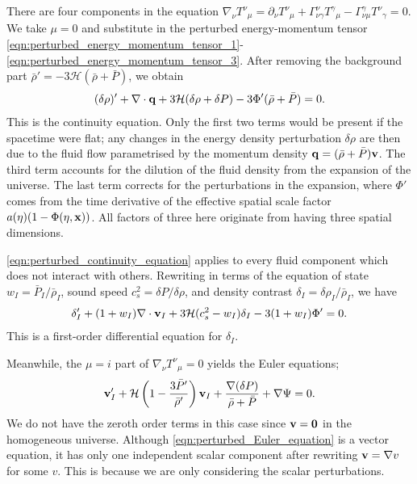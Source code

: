 There are four components in the equation $\nabla_\nu {T^\nu}_\mu = \partial_\nu {T^\nu}_\mu + \Gamma^\nu_{\nu\gamma} {T^\gamma}_\mu - \Gamma^\gamma_{\nu\mu} {T^\nu}_\gamma=0$. We take $\mu=0$ and substitute in the perturbed energy-momentum tensor \eqref{eqn:perturbed_energy_momentum_tensor_1}-\eqref{eqn:perturbed_energy_momentum_tensor_3}. After removing the background part $\bar{\rho}'=-3\mathcal{H}(\bar{\rho}+\bar{P})$, we obtain
\begin{align}
	(\delta\rho)' + \nabla \cdot \mathbf{q}+ 3 \mathcal{H} (\delta\rho + \delta P) - 3 \Phi' (\bar{\rho} + \bar{P})  = 0.  \label{eqn:perturbed_continuity_equation}
\end{align}
This is the continuity equation. Only the first two terms would be present if the spacetime were flat; any changes in the energy density perturbation $\delta\rho$ are then due to the fluid flow parametrised by the momentum density $\mathbf{q} = (\bar{\rho}+\bar{P})\mathbf{v}$. The third term accounts for the dilution of the fluid density from the expansion of the universe. The last term corrects for the perturbations in the expansion, where $\Phi'$ comes from the time derivative of the effective spatial scale factor $a(\eta)(1-\Phi(\eta,\mathbf{x}))$. All factors of three here originate from having three spatial dimensions.

\eqref{eqn:perturbed_continuity_equation} applies to every fluid component which does not interact with others. Rewriting in terms of the equation of state $w_I = \bar{P}_I / \bar{\rho}_I$, sound speed $c_s^2 = \delta P / \delta\rho$, and density contrast $\delta_I = \delta\rho_I / \bar{\rho}_I$, we have
\begin{align}
	\delta'_I + (1+w_I) \nabla\cdot\mathbf{v}_I + 3\mathcal{H}(c_s^2-w_I)\delta_I - 3(1+w_I) \Phi' = 0.
\end{align}
This is a first-order differential equation for $\delta_I$.

Meanwhile, the $\mu=i$ part of $\nabla_\nu {T^\nu}_\mu =0$ yields the Euler equations;
\begin{align}
	\mathbf{v}'_I + \mathcal{H} \left( 1 - \frac{3\bar{P}'}{\bar{\rho}'} \right) \mathbf{v}_I + \frac{\nabla(\delta P)}{\bar{\rho} + \bar{P}} + \nabla\Psi = 0. \label{eqn:perturbed_Euler_equation}
\end{align}
We do not have the zeroth order terms in this case since $\mathbf{v}=\mathbf{0}$ in the homogeneous universe. Although \eqref{eqn:perturbed_Euler_equation} is a vector equation, it has only one independent scalar component after rewriting $\mathbf{v}=\nabla v$ for some $v$. This is because we are only considering the scalar perturbations.

